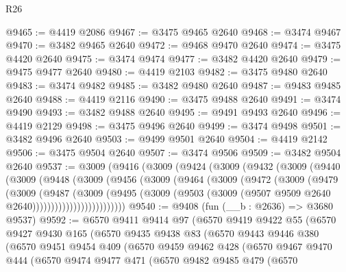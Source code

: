 \begin{lexlean}{R26}
\begin{coremodule}
@9465 := @4419 @2086
@9467 := @3475 @9465 @2640
@9468 := @3474 @9467
@9470 := @3482 @9465 @2640
@9472 := @9468 @9470 @2640
@9474 := @3475 @4420 @2640
@9475 := @3474 @9474
@9477 := @3482 @4420 @2640
@9479 := @9475 @9477 @2640
@9480 := @4419 @2103
@9482 := @3475 @9480 @2640
@9483 := @3474 @9482
@9485 := @3482 @9480 @2640
@9487 := @9483 @9485 @2640
@9488 := @4419 @2116
@9490 := @3475 @9488 @2640
@9491 := @3474 @9490
@9493 := @3482 @9488 @2640
@9495 := @9491 @9493 @2640
@9496 := @4419 @2129
@9498 := @3475 @9496 @2640
@9499 := @3474 @9498
@9501 := @3482 @9496 @2640
@9503 := @9499 @9501 @2640
@9504 := @4419 @2142
@9506 := @3475 @9504 @2640
@9507 := @3474 @9506
@9509 := @3482 @9504 @2640
@9537 := @3009
    (@9416
      (@3009
        (@9424
          (@3009
            (@9432
              (@3009
                (@9440
                  (@3009
                    (@9448
                      (@3009
                        (@9456
                          (@3009
                            (@9464
                              (@3009
                                (@9472
                                  (@3009
                                    (@9479
                                      (@3009
                                        (@9487
                                          (@3009
                                            (@9495
                                              (@3009
                                                (@9503
                                                  (@3009
                                                    (@9507
                                                      @9509
                                                      @2640
                                                      @2640)))))))))))))))))))))))))
@9540 := @9408 (fun (__b : @2636) => @3680 @9537)
@9592 := @6570
    @9411
    @9414
    @97
    (@6570
      @9419
      @9422
      @55
      (@6570
        @9427
        @9430
        @165
        (@6570
          @9435
          @9438
          @83
          (@6570
            @9443
            @9446
            @380
            (@6570
              @9451
              @9454
              @409
              (@6570
                @9459
                @9462
                @428
                (@6570
                  @9467
                  @9470
                  @444
                  (@6570
                    @9474
                    @9477
                    @471
                    (@6570
                      @9482
                      @9485
                      @479
                      (@6570

\end{coremodule}
\end{lexlean}
